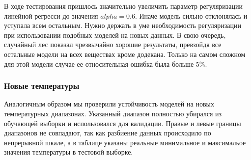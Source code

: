 \documentclass[a4paper,12pt]{article}
\begin{document}
      В ходе тестирования пришлось значительно увеличить параметр регуляризации линейной регресси до значения \( alpha = 0.6 \). Иначе модель сильно отклонялась и уступала всем остальным. Нужно держать в уме необходимость регуляризации при использовании подобных моделей на новых данных.
      В свою очередь, случайный лес показал чрезвычайно хорошие результаты, превзойдя все остальные модели на всех веществах кроме додекана. Только на самом сложном для этой модели случае ее относительная ошибка была больше 5\%.

    \subsubsection{Новые температуры}

      Аналогичным образом мы проверили устойчивость моделей на новых температурных диапазонах. Указанный диапазон полностью убирался из обучающей выборки и использовался для валидации. Правые и левые границы диапазонов не совпадают, так как разбиение данных происходило по непрерывной шкале, а в таблице указаны реальные минимальное и максимальое значения температуры в тестовой выборке.
\end{document}

